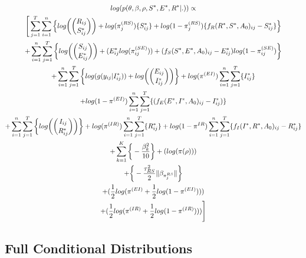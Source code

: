 \documentclass[12pt]{article}
\begin{document}
\begin{center}
\begin{multline}
\displaystyle
log(p(\theta,\beta,\rho,S^*,E^*,R^*|.)) \propto\\ \Bigg[ 
    \sum_{j=1}^T \sum_{i=1}^n\Big\{log\bigg(\dbinom{R_{ij}}{S^*_{ij}}\bigg) + log(\pi_j^{(RS)})\{S^*_{ij}\} + 
            log(1-\pi_j^{(RS)})\{f_R(R^*, S^*, A_0)_{ij} - S^*_{ij}\}\Big\} \\ 
            +\sum_{i=1}^n \sum_{j=1}^T\bigg\{
            log\bigg(\dbinom{S_{ij}}{E^*_{ij}}\bigg) + (E^*_{ij}log(\pi_{ij}^{(SE)})) + (f_S(S^*, E^*, A_0)_{ij} - E^*_{ij})log(1-\pi_{ij}^{(SE)})\bigg\} \\
            + \sum_{i=1}^n\sum_{j=1}^T\bigg\{log(g(y_{ij}|I^*_{ij})) + log\bigg(\dbinom{E_{ij}}{I^*_{ij}}\bigg)\bigg\} 
            + log(\pi^{(EI)})\sum_{i=1}^n\sum_{j=1}^T\{I^*_{ij}\} \\
            + log(1-\pi^{(EI)})\sum_{i=1}^n\sum_{j=1}^T\{(f_E(E^*, I^*, A_0)_{ij} - I^*_{ij})\}\\
            + \sum_{i=1}^n\sum_{j=1}^T\bigg\{ log\bigg(\dbinom{I_{ij}}{R^*_{ij}}\bigg)\bigg\} + log(\pi^{(IR)})\sum_{i=1}^n\sum_{j=1}^T\{R^*_{ij}\} + 
            log(1-\pi^{IR})\sum_{i=1}^n\sum_{j=1}^T\{ f_I(I^*, R^*, A_0)_{ij} - R^*_{ij}\}\\
            + \sum_{k = 1}^K\bigg\{-\frac{\beta^2_k}{10}\bigg\}
            + (log(\pi(\rho)))\\
            + \bigg\{ -\frac{\tau^2_{RS}}{2}\|\beta_{\pi_j^{RS}}\|  \bigg\} \\ 
            + (\frac{1}{2}log(\pi^{(EI)} + \frac{1}{2}log(1-\pi^{(EI)}))) \\
            + (\frac{1}{2}log(\pi^{(IR)} + \frac{1}{2}log(1-\pi^{(IR)})))  \Bigg]\\
\end{multline}
\end{center}


\subsection{Full Conditional Distributions}
\end{document}
